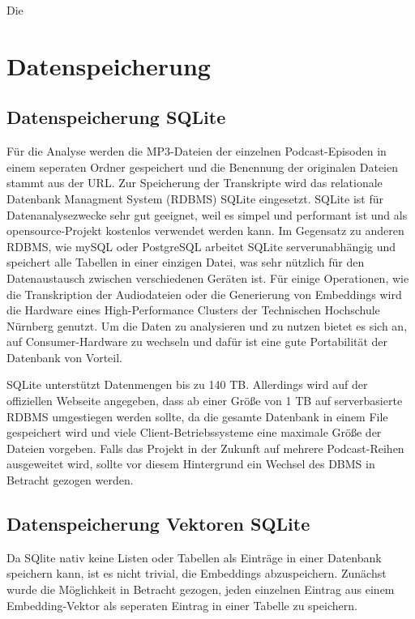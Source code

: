Die 




\section{Datenspeicherung}

\subsection{Datenspeicherung SQLite}

Für die Analyse werden die MP3-Dateien der einzelnen Podcast-Episoden in einem seperaten Ordner gespeichert und die Benennung der originalen Dateien stammt aus der URL.
Zur Speicherung der Transkripte wird das relationale Datenbank Managment System (RDBMS) SQLite  eingesetzt. SQLite ist für Datenanalysezwecke sehr gut geeignet, weil es simpel und performant ist und als opensource-Projekt kostenlos verwendet werden kann.
Im Gegensatz zu anderen RDBMS, wie mySQL oder PostgreSQL arbeitet SQLite serverunabhängig und speichert alle Tabellen in einer einzigen Datei, was sehr nützlich für den Datenaustausch zwischen verschiedenen Geräten ist.
Für einige Operationen, wie die Transkription der Audiodateien oder die Generierung von Embeddings wird die Hardware eines High-Performance Clusters der Technischen Hochschule Nürnberg genutzt. 
Um die Daten zu analysieren und zu nutzen bietet es sich an, auf Consumer-Hardware zu wechseln und dafür ist eine gute Portabilität der Datenbank von Vorteil.

SQLite unterstützt Datenmengen bis zu 140 TB. 
Allerdings wird auf der offiziellen Webseite angegeben, dass ab einer Größe von 1 TB auf serverbasierte RDBMS umgestiegen werden sollte, da die gesamte Datenbank in einem File gespeichert wird und viele Client-Betriebssysteme eine maximale Größe der Dateien vorgeben. 
Falls das Projekt in der Zukunft auf mehrere Podcast-Reihen ausgeweitet wird, sollte vor diesem Hintergrund ein Wechsel des DBMS in Betracht gezogen werden.

\subsection{Datenspeicherung Vektoren SQLite}

Da SQlite nativ keine Listen oder Tabellen als Einträge in einer Datenbank speichern kann, ist es nicht trivial, die Embeddings abzuspeichern.
Zunächst wurde die Möglichkeit in Betracht gezogen, jeden einzelnen Eintrag aus einem Embedding-Vektor als seperaten Eintrag in einer Tabelle zu speichern. 

